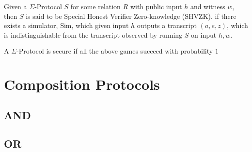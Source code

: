 \begin{definition}
Given a $\Sigma$-Protocol $S$ for some relation $R$ with public input $h$ and
witness $w$, then $S$ is said to be Special Honest Verifier Zero-knowledge
(SHVZK), if there exists a simulator, Sim, which given input $h$ outputs a
transcript $(a,e,z)$, which is indistinguishable from the transcript observed by
running $S$ on input $h, w$.


\end{definition}

\begin{lemma}
  A $\Sigma$-Protocol is secure if all the above games succeed with probability $1$
\end{lemma}



\section{Composition Protocols}
\label{sec:sigma_comp}

\subsection{AND}
\label{subsec:sigma_AND}

\subsection{OR}
\label{subsec:sigma_OR}







